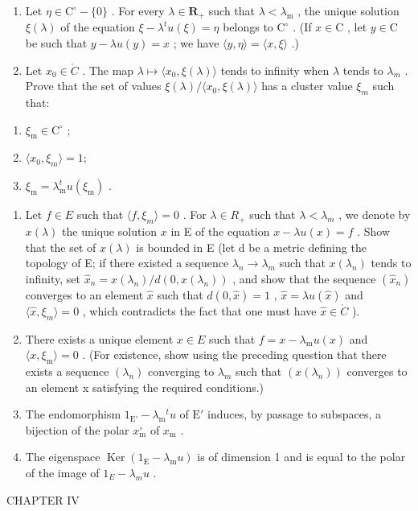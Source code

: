\begin{enumerate}
\def\labelenumi{\alph{enumi})}
\item
  Let \(\eta \in \mathrm{C}^{\circ} - \{0\}\) . For every \(\lambda \in \mathbf{R}_{+}\) such that \(\lambda < \lambda_{\mathrm{m}}\) , the unique solution \(\xi(\lambda)\) of the equation \(\xi - \lambda^{t}u(\xi) = \eta\) belongs to \(\mathrm{C}^{\circ}\) . (If \(x \in \mathrm{C}\) , let \(y \in \mathrm{C}\) be such that \(y - \lambda u(y) = x\) ; we have \(\langle y, \eta \rangle = \langle x, \xi \rangle\) .)
\item
  Let \(x_{0} \in \mathring{C}\) . The map \(\lambda \mapsto \langle x_{0}, \xi(\lambda) \rangle\) tends to infinity when \(\lambda\) tends to \(\lambda_{m}\) . Prove that the set of values \(\xi(\lambda)/\langle x_{0}, \xi(\lambda) \rangle\) has a cluster value \(\xi_{m}\) such that:
\end{enumerate}

\begin{enumerate}
\def\labelenumi{(\roman{enumi})}
\item
  \(\xi_{\mathrm{m}}\in \mathrm{C}^{\circ}\) ;
\item
  \(\langle x_{0},\xi_{m}\rangle=1;\)
\item
  \(\xi_{\mathrm{m}} = \lambda_{\mathrm{m}}^{t}u(\xi_{\mathrm{m}})\) .
\end{enumerate}

\begin{enumerate}
\def\labelenumi{\alph{enumi})}
\setcounter{enumi}{2}
\item
  Let \(f \in E\) such that \(\langle f, \xi_{m} \rangle = 0\) . For \(\lambda \in R_{+}\) such that \(\lambda < \lambda_{m}\) , we denote by \(x(\lambda)\) the unique solution \(x\) in E of the equation \(x - \lambda u(x) = f\) . Show that the set of \(x(\lambda)\) is bounded in E (let d be a metric defining the topology of E; if there existed a sequence \(\lambda_{n} \to \lambda_{m}\) such that \(x(\lambda_{n})\) tends to infinity, set \(\hat{x}_{n} = x(\lambda_{n}) / d(0, x(\lambda_{n}))\) , and show that the sequence \((\hat{x}_{n})\) converges to an element \(\hat{x}\) such that \(d(0, \hat{x}) = 1\) , \(\hat{x} = \lambda u(\hat{x})\) and \(\langle \hat{x}, \xi_{m} \rangle = 0\) , which contradicts the fact that one must have \(\hat{x} \in \mathring{C}\) ).
\item
  There exists a unique element \(x \in E\) such that \(f = x - \lambda_{\mathrm{m}} u(x)\) and \(\langle x, \xi_{\mathrm{m}} \rangle = 0\) . (For existence, show using the preceding question that there exists a sequence \((\lambda_{n})\) converging to \(\lambda_{m}\) such that \((x(\lambda_{n}))\) converges to an element x satisfying the required conditions.)
\item
  The endomorphism \(1_{\mathrm{E}'} - \lambda_{\mathrm{m}}{}^{t}u\) of \(\mathrm{E}'\) induces, by passage to subspaces, a bijection of the polar \(x_{\mathrm{m}}^{\circ}\) of \(x_{\mathrm{m}}\) .
\item
  The eigenspace \(\operatorname{Ker}(1_{\mathrm{E}} - \lambda_{\mathrm{m}}u)\) is of dimension 1 and is equal to the polar of the image of \(1_{E} - \lambda_{m}u\) .
\end{enumerate}

CHAPTER IV

